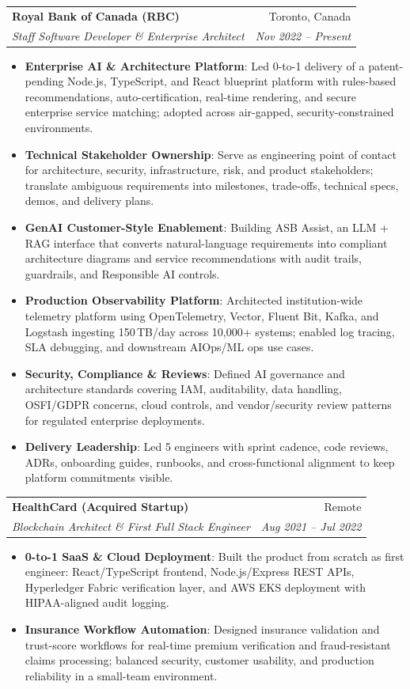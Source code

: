 \documentclass[letterpaper,9.5pt]{article}
\makeatletter
\newcommand{\resumeItem}[2]{
  \item\small{
    \textbf{#1}{: #2 \vspace{-2pt}}
  }
}
\newcommand{\resumeSubheading}[4]{
  \vspace{-1pt}\item
    \begin{tabular*}{0.97\textwidth}{l@{\extracolsep{\fill}}r}
      \textbf{#1} & #2 \\
      \textit{\small#3} & \textit{\small #4} \\
    \end{tabular*}\vspace{-5pt}
}
\newcommand{\resumeItemListStart}{\begin{itemize}}
\newcommand{\resumeItemListEnd}{\end{itemize}\vspace{-5pt}}
\makeatother
\begin{document}
  \resumeSubheading
    {Royal Bank of Canada (RBC)}{Toronto, Canada}
    {Staff Software Developer \& Enterprise Architect}{Nov 2022 -- Present}
    \resumeItemListStart
      \resumeItem{Enterprise AI \& Architecture Platform}
        {Led 0-to-1 delivery of a patent-pending Node.js, TypeScript, and React blueprint platform with rules-based recommendations, auto-certification, real-time rendering, and secure enterprise service matching; adopted across air-gapped, security-constrained environments.}
      \resumeItem{Technical Stakeholder Ownership}
        {Serve as engineering point of contact for architecture, security, infrastructure, risk, and product stakeholders; translate ambiguous requirements into milestones, trade-offs, technical specs, demos, and delivery plans.}
      \resumeItem{GenAI Customer-Style Enablement}
        {Building ASB Assist, an LLM + RAG interface that converts natural-language requirements into compliant architecture diagrams and service recommendations with audit trails, guardrails, and Responsible AI controls.}
      \resumeItem{Production Observability Platform}
        {Architected institution-wide telemetry platform using OpenTelemetry, Vector, Fluent Bit, Kafka, and Logstash ingesting 150\,TB/day across 10,000+ systems; enabled log tracing, SLA debugging, and downstream AIOps/ML ops use cases.}
      \resumeItem{Security, Compliance \& Reviews}
        {Defined AI governance and architecture standards covering IAM, auditability, data handling, OSFI/GDPR concerns, cloud controls, and vendor/security review patterns for regulated enterprise deployments.}
      \resumeItem{Delivery Leadership}
        {Led 5 engineers with sprint cadence, code reviews, ADRs, onboarding guides, runbooks, and cross-functional alignment to keep platform commitments visible.}
    \resumeItemListEnd

  \resumeSubheading
    {HealthCard (Acquired Startup)}{Remote}
    {Blockchain Architect \& First Full Stack Engineer}{Aug 2021 -- Jul 2022}
    \resumeItemListStart
      \resumeItem{0-to-1 SaaS \& Cloud Deployment}
        {Built the product from scratch as first engineer: React/TypeScript frontend, Node.js/Express REST APIs, Hyperledger Fabric verification layer, and AWS EKS deployment with HIPAA-aligned audit logging.}
      \resumeItem{Insurance Workflow Automation}
        {Designed insurance validation and trust-score workflows for real-time premium verification and fraud-resistant claims processing; balanced security, customer usability, and production reliability in a small-team environment.}
    \resumeItemListEnd
\end{document}
